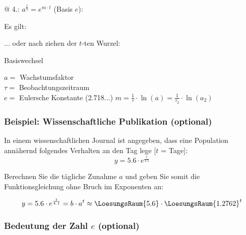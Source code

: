 @ 4.: $a^\frac{t}5 = e^{m\cdot{}t}$ (Basis $e$):

\newpage

\begin{center}
  \end{center}

Es gilt:
\begin{center}
\end{center}

... oder nach ziehen der $t$-ten Wurzel:

\begin{gesetz}{Basiswechsel}{}

  \begin{center}\end{center}

 
  $a=$ Wachstumsfaktor\\
  $\tau=$ Beobachtungszeitraum\\
  $e=$ Eulersche Konstante (2.718...)
  $m=\frac1\tau\cdot{}\ln(a) = \frac1{\tau_2}\cdot{}\ln(a_2)$
\end{gesetz}
\newpage

\subsubsection{Beispiel: Wissenschaftliche Publikation (optional)}
In einem wissenschaftlichen Journal ist angegeben, dass eine Population annähernd folgendes Verhalten an den Tag lege [$t$ = Tage]:
$$y = 5.6\cdot{} e^{\frac{t}{4.1}}$$

Berechnen Sie die tägliche Zunahme $a$ und geben Sie somit die Funktionsgleichung ohne Bruch im Exponenten an:

$$y = 5.6\cdot{} e^{\frac{t}{4.1}} = b\cdot{}a^t \approx \LoesungsRaum{5.6} \cdot{} \LoesungsRaum{1.2762}^t$$

\newpage

\subsubsection{Bedeutung der Zahl $e$ (optional)}

